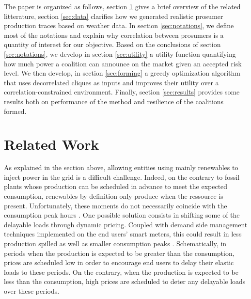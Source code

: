 \documentclass[conference]{IEEEtran}
\begin{document}
The paper is organized as follows, section \ref{sec:related} gives a brief overview of the related litterature, section \ref{sec:data} clarifies how we generated realistic prosumer production traces based on weather data. In section \ref{sec:notations}, we define most of the notations and explain why correlation between prosumers is a quantity of interest for our objective. Based on the conclusions of section \ref{sec:notations}, we develop in section \ref{sec:utility} a utility function quantifying how much power a coalition can announce on the market given an accepted risk level. We then develop, in section \ref{sec:forming} a greedy optimization algorithm that uses decorrelated cliques as inputs and improves their utility over a correlation-constrained environment. Finally, section \ref{sec:results} provides some results both on performance of the method and resilience of the coalitions formed.


%
%

\section{Related Work}
\label{sec:related}

As explained in the section above, allowing entities using mainly renewables to inject power in the grid is a difficult challenge. Indeed, on the contrary to fossil plants whose production can be scheduled in advance to meet the expected consumption, renewables by definition only produce when the ressource is present. Unfortunately, these moments do not necessarily coincide with the consumption peak hours \cite{Milligan2010}. One possible solution consists in shifting some of the delayable loads through dynamic pricing. Coupled with demand side management techniques implemented on the end users' smart meters, this could result in less production spilled as well as smaller consumption peaks \cite{Milligan2010} \cite{Logenthiran2012}. Schematically, in periods when the production is expected to be greater than the consumption, prices are scheduled low in order to encourage end users to delay their elastic loads to these periods. On the contrary, when the production is expected to be less than the consumption, high prices are scheduled to deter any delayable loads over these periods.
\end{document}
